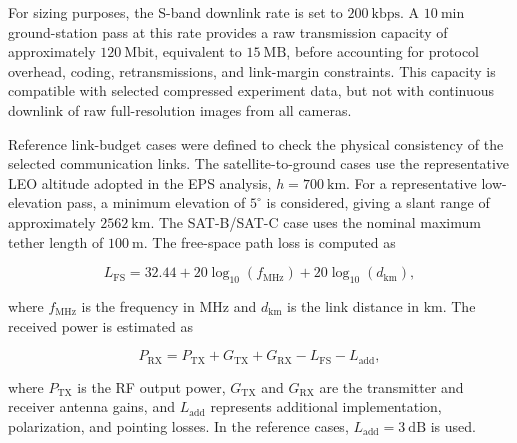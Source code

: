 For sizing purposes, the S-band downlink rate is set to \(200~\mathrm{kbps}\). A \(10~\mathrm{min}\) ground-station pass at this rate provides a raw transmission capacity of approximately \(120~\mathrm{Mbit}\), equivalent to \(15~\mathrm{MB}\), before accounting for protocol overhead, coding, retransmissions, and link-margin constraints. This capacity is compatible with selected compressed experiment data, but not with continuous downlink of raw full-resolution images from all cameras.

Reference link-budget cases were defined to check the physical consistency of the selected communication links. The satellite-to-ground cases use the representative LEO altitude adopted in the EPS analysis, \(h=700~\mathrm{km}\). For a representative low-elevation pass, a minimum elevation of \(5^\circ\) is considered, giving a slant range of approximately \(2562~\mathrm{km}\). The SAT-B/SAT-C case uses the nominal maximum tether length of \(100~\mathrm{m}\). The free-space path loss is computed as

\begin{equation}
    L_\mathrm{FS} =
    32.44 + 20\log_{10}(f_\mathrm{MHz}) + 20\log_{10}(d_\mathrm{km}),
\end{equation}

where \(f_\mathrm{MHz}\) is the frequency in MHz and \(d_\mathrm{km}\) is the link distance in km. The received power is estimated as

\begin{equation}
    P_\mathrm{RX} =
    P_\mathrm{TX} + G_\mathrm{TX} + G_\mathrm{RX}
    - L_\mathrm{FS} - L_\mathrm{add},
\end{equation}

where \(P_\mathrm{TX}\) is the RF output power, \(G_\mathrm{TX}\) and \(G_\mathrm{RX}\) are the transmitter and receiver antenna gains, and \(L_\mathrm{add}\) represents additional implementation, polarization, and pointing losses. In the reference cases, \(L_\mathrm{add}=3~\mathrm{dB}\) is used.

